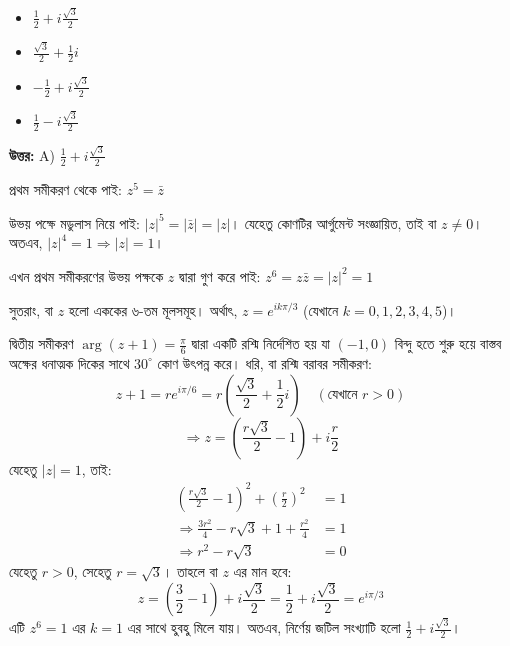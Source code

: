 \documentclass[12pt, a4paper]{article}
\begin{document}
\begin{itemize}[label={}, leftmargin=1cm, itemsep=0.5em]
    \item[\textbf{A)}] $\frac{1}{2} + i\frac{\sqrt{3}}{2}$
    \item[\textbf{B)}] $\frac{\sqrt{3}}{2} + \frac{1}{2}i$
    \item[\textbf{C)}] $-\frac{1}{2} + i\frac{\sqrt{3}}{2}$
    \item[\textbf{D)}] $\frac{1}{2} - i\frac{\sqrt{3}}{2}$
\end{itemize}

\vspace{0.5em}
\begin{tcolorbox}[answerbox]
    \textbf{\color{success} উত্তর:} A) $\frac{1}{2} + i\frac{\sqrt{3}}{2}$
\end{tcolorbox}
\vspace{1em}

\begin{tcolorbox}[solutionbox={সমাধান (Solution)}]
    \noindent
    প্রথম সমীকরণ থেকে পাই: $z^5 = \bar{z}$
    
    উভয় পক্ষে মডুলাস নিয়ে পাই: $|z|^5 = |\bar{z}| = |z|$। যেহেতু কোণটির আর্গুমেন্ট সংজ্ঞায়িত, তাই বা $z \neq 0$। অতএব, $|z|^4 = 1 \Rightarrow |z| = 1$। 
    
    এখন প্রথম সমীকরণের উভয় পক্ষকে $z$ দ্বারা গুণ করে পাই: $z^6 = z \bar{z} = |z|^2 = 1$
    
    সুতরাং, বা $z$ হলো এককের ৬-তম মূলসমূহ। অর্থাৎ, $z = e^{i k\pi/3}$ (যেখানে $k = 0, 1, 2, 3, 4, 5$)। 
    
    দ্বিতীয় সমীকরণ $\arg(z + 1) = \frac{\pi}{6}$ দ্বারা একটি রশ্মি নির্দেশিত হয় যা $(-1, 0)$ বিন্দু হতে শুরু হয়ে বাস্তব অক্ষের ধনাত্মক দিকের সাথে $30^\circ$ কোণ উৎপন্ন করে। ধরি, বা রশ্মি বরাবর সমীকরণ:
    \[ z + 1 = r e^{i\pi/6} = r\left(\frac{\sqrt{3}}{2} + \frac{1}{2}i\right) \quad (\text{যেখানে } r > 0) \]
    \[ \Rightarrow z = \left(\frac{r\sqrt{3}}{2} - 1\right) + i\frac{r}{2} \]
    যেহেতু $|z| = 1$, তাই:
    \begin{align*}
        \left(\frac{r\sqrt{3}}{2} - 1\right)^2 + \left(\frac{r}{2}\right)^2 &= 1 \\
        \Rightarrow \frac{3r^2}{4} - r\sqrt{3} + 1 + \frac{r^2}{4} &= 1 \\
        \Rightarrow r^2 - r\sqrt{3} &= 0
    \end{align*}
    যেহেতু $r > 0$, সেহেতু $r = \sqrt{3}$। তাহলে বা $z$ এর মান হবে:
    \[ z = \left(\frac{3}{2} - 1\right) + i\frac{\sqrt{3}}{2} = \frac{1}{2} + i\frac{\sqrt{3}}{2} = e^{i\pi/3} \]
    এটি $z^6 = 1$ এর $k=1$ এর সাথে হুবহু মিলে যায়। অতএব, নির্ণেয় জটিল সংখ্যাটি হলো $\frac{1}{2} + i\frac{\sqrt{3}}{2}$।
\end{tcolorbox}
\end{document}
